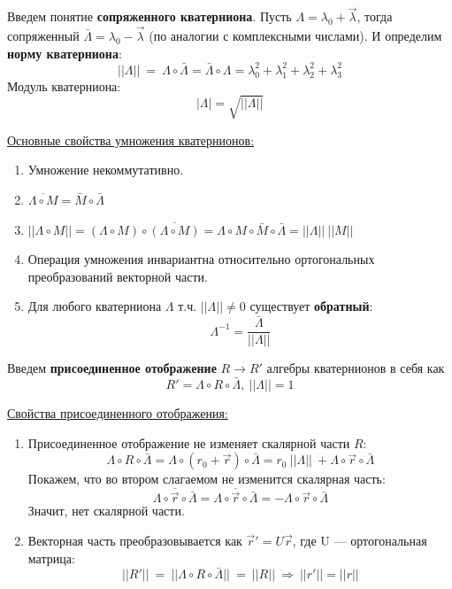 Введем понятие \textbf{сопряженного кватерниона}. Пусть $\Lambda = \lambda_0 + \vec{\lambda}$, тогда сопряженный $\bar\Lambda = \lambda_0 - \vec{\lambda}$ (по аналогии с комплексными числами). И определим \textbf{норму кватерниона}:
\[
||\Lambda||~ =~ \Lambda \circ \bar\Lambda = \bar\Lambda \circ \Lambda = \lambda_0^2 + \lambda_1^2 + \lambda_2^2 + \lambda_3^2
\]
Модуль кватерниона:
\[
|\Lambda| = \sqrt{||\Lambda||}
\]

\underline{Основные свойства умножения кватернионов:}
\begin{enumerate}
    \item Умножение некоммутативно.
    \item $\overline{\Lambda \circ M} = \bar M \circ \bar\Lambda$
    \item $||\Lambda \circ M|| = (\Lambda \circ M)\circ \overline{(\Lambda \circ M)} = \Lambda \circ M \circ \bar M \circ \bar\Lambda = ||\Lambda||~||M||$
    \item Операция умножения инвариантна относительно ортогональных преобразований векторной части.
    \item Для любого кватерниона $\Lambda$ т.ч. $||\Lambda|| \neq 0$ существует \textbf{обратный}:
    \[
    \Lambda^{-1} = \dfrac{\bar\Lambda}{||\Lambda||}
    \]
\end{enumerate}

\begin{definition}
    Введем \textbf{присоединенное отображение} $R \longrightarrow R'$ алгебры кватернионов в себя как
    \[
    R' = \Lambda \circ R \circ \bar\Lambda, \ ||\Lambda|| = 1
    \]
\end{definition}
\underline{Свойства присоединенного отображения:}
\begin{enumerate}
    \item Присоединенное отображение не изменяет скалярной части $R$:
    \[
    \Lambda \circ R \circ \bar \Lambda = \Lambda \circ (r_0 + \vec{r}) \circ \bar{\Lambda} = r_0~||\Lambda||~ + \Lambda \circ \vec{r} \circ \bar{\Lambda}
    \]
    Покажем, что во втором слагаемом не изменится скалярная часть:
    \[
    \overline{\Lambda\circ \vec{r} \circ \bar{\Lambda}} = \Lambda\circ \overline{\vec{r}} \circ \bar{\Lambda} = - \Lambda\circ \vec{r} \circ \bar{\Lambda}
    \]
    Значит, нет скалярной части.
    \item Векторная часть преобразовывается как $\vec{r}' = U\vec{r}$, где U --- ортогональная матрица:
    \[
    ||R'||~ = ~ ||\Lambda \circ R \circ \bar \Lambda|| ~=~ ||R|| \ \Longrightarrow \ ||r'|| = ||r||
    \]
\end{enumerate}


